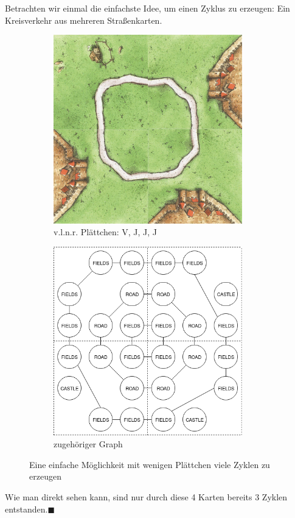 \documentclass{article}
\newcommand*{\qed}{\hfill\ensuremath{\blacksquare}\\}%
\begin{document}
Betrachten wir einmal die einfachste Idee, um einen Zyklus zu erzeugen: Ein Kreisverkehr aus mehreren Stra{\ss}enkarten.
\begin{figure}[H]
	\centering
	\begin{subfigure}{.5\textwidth}
		\centering
		\includegraphics[width=0.9\textwidth]{Zyklischer_Graph.png}
		\caption{v.l.n.r. Pl\"attchen: V, J, J, J}
	\end{subfigure}%
	\begin{subfigure}{.5\textwidth}
		\centering
		\includegraphics[width=0.9\textwidth]{Zyklischer_Graph1.png}
		\caption{zugeh\"origer Graph}
	\end{subfigure}
	\caption{Eine einfache M\"oglichkeit mit wenigen Pl\"attchen viele Zyklen zu erzeugen}
\end{figure}
Wie man direkt sehen kann, sind nur durch diese 4 Karten bereits 3 Zyklen entstanden.\qed
\end{document}
